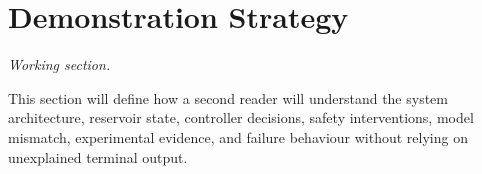 \section{Demonstration Strategy}
\label{sec:demonstration}

\textit{Working section.}

This section will define how a second reader will understand the system architecture,
reservoir state, controller decisions, safety interventions, model mismatch,
experimental evidence, and failure behaviour without relying on unexplained
terminal output.
